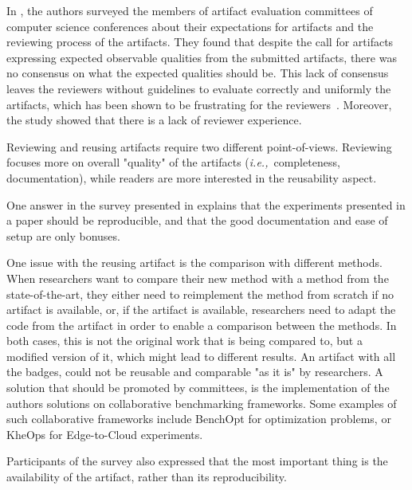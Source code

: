 \documentclass[sigconf,natbib=false]{acmart}
\newcommand{\ie}{\emph{i.e.,}}
\begin{document}
In \cite{hermann2020community}, the authors surveyed the members of artifact evaluation committees of computer science conferences about their expectations for artifacts and the reviewing process of the artifacts. 
They found that despite the call for artifacts expressing expected observable qualities from the submitted artifacts, there was no consensus on what the expected qualities should be.
This lack of consensus leaves the reviewers without guidelines to evaluate correctly and uniformly the artifacts, which has been shown to be frustrating for the reviewers\ \cite{beller2020will}.
Moreover, the study showed that there is a lack of reviewer experience.

Reviewing and reusing artifacts require two different point-of-views.
Reviewing focuses more on overall "quality" of the artifacts (\ie\ completeness, documentation), while readers are more interested in the reusability aspect.

One answer in the survey presented in \cite{hermann2020community} explains that the experiments presented in a paper should be reproducible, and that the good documentation and ease of setup are only bonuses.

One issue with the reusing artifact is the comparison with different methods.
When researchers want to compare their new method with a method from the state-of-the-art, they either need to reimplement the method from scratch if no artifact is available, or, if the artifact is available, researchers need to adapt the code from the artifact in order to enable a comparison between the methods.
In both cases, this is not the original work that is being compared to, but a modified version of it, which might lead to different results.
An artifact with all the badges, could not be reusable and comparable "as it is" by researchers.
A solution that should be promoted by committees, is the implementation of the authors solutions on collaborative benchmarking frameworks.
Some examples of such collaborative frameworks include BenchOpt \cite{moreau2022benchopt} for optimization problems, or KheOps \cite{rosendo2023kheops} for Edge-to-Cloud experiments.



Participants of the survey also expressed that the most important thing is the availability of the artifact, rather than its reproducibility.
\end{document}
